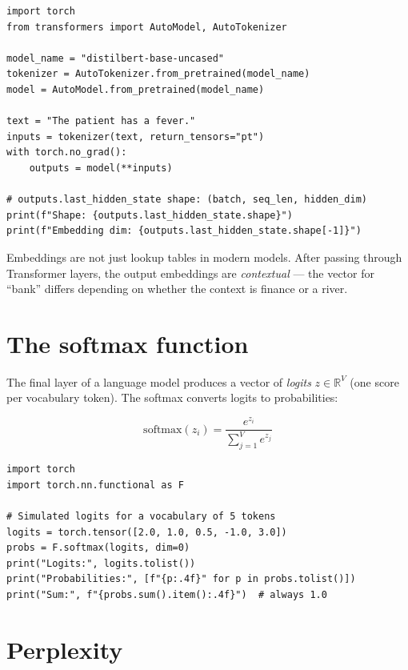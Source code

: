 \begin{verbatim}
import torch
from transformers import AutoModel, AutoTokenizer

model_name = "distilbert-base-uncased"
tokenizer = AutoTokenizer.from_pretrained(model_name)
model = AutoModel.from_pretrained(model_name)

text = "The patient has a fever."
inputs = tokenizer(text, return_tensors="pt")
with torch.no_grad():
    outputs = model(**inputs)

# outputs.last_hidden_state shape: (batch, seq_len, hidden_dim)
print(f"Shape: {outputs.last_hidden_state.shape}")
print(f"Embedding dim: {outputs.last_hidden_state.shape[-1]}")
\end{verbatim}

\begin{aitip}
Embeddings are not just lookup tables in modern models. After passing through Transformer layers, the output embeddings are \emph{contextual} --- the vector for ``bank'' differs depending on whether the context is finance or a river.
\end{aitip}

\section{The softmax function}

The final layer of a language model produces a vector of \emph{logits} $z \in \mathbb{R}^V$ (one score per vocabulary token). The softmax converts logits to probabilities:

\[
\text{softmax}(z_i) = \frac{e^{z_i}}{\sum_{j=1}^{V} e^{z_j}}
\]

\begin{verbatim}
import torch
import torch.nn.functional as F

# Simulated logits for a vocabulary of 5 tokens
logits = torch.tensor([2.0, 1.0, 0.5, -1.0, 3.0])
probs = F.softmax(logits, dim=0)
print("Logits:", logits.tolist())
print("Probabilities:", [f"{p:.4f}" for p in probs.tolist()])
print("Sum:", f"{probs.sum().item():.4f}")  # always 1.0
\end{verbatim}

\section{Perplexity}
\label{sec:perplexity}

